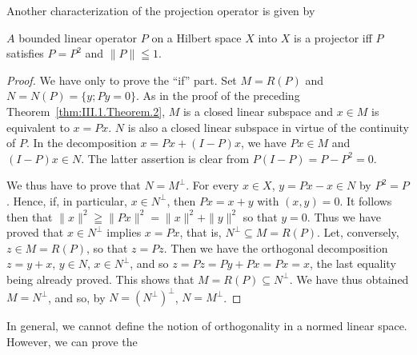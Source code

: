 Another characterization of the projection operator is given by 

\begin{theorem}\label{thm:III.1.Theorem.3} $A$ bounded linear operator $P$ on a Hilbert space $X$ into $X$ is a projector iff $P$ satisfies $P = P^2$ and $\| P \| \leqq 1$. 
\end{theorem}

\begin{proof}
 We have only to prove the ``if'' part. Set $M = R(P)$ and $N = N(P) = \{y; P y = 0\}$. As in the proof of the preceding Theorem~\ref{thm:III.1.Theorem.2}, $M$ is a closed linear subspace and $x \in M$ is equivalent to $x = Px$. $N$ is also a closed linear subspace in virtue of the continuity of $P$. In the decomposition $x = Px + (I - P)x$, we have $Px \in M$ and $(I - P)x \in N$. The latter assertion is clear from $P(I - P) = P - P^{2} = 0$. 

We thus have to prove that $N = M^{\perp}$. For every $x \in X$, $y = Px - x \in N$ by $P^2 = P$. Hence, if, in particular, $x \in N^{\perp}$, then $Px = x + y$ with $(x, y) = 0$. It follows then that $\|x\|^2 \geqq \|Px\|^2 = \|x\|^2 + \|y\|^2$ so that $y = 0$. Thus we have proved that $x \in N^{\perp}$ implies $x = Px$, that is, $N^{\perp} \subseteq M = R(P)$. Let, conversely, $z \in M = R(P)$, so that $z = Pz$. Then we have the orthogonal decomposition $z = y + x$, $y \in N$, $x \in N^{\perp}$, and so $z = Pz = Py + Px = Px = x$, the last equality being already proved. This shows that $M = R(P) \subseteq N^{\perp}$. We have thus obtained $M = N^{\perp}$, and so, by $N = (N^{\perp})^{\perp}$, $N = M^{\perp}$. 
\end{proof}


\label{sec:III.2}

In general, we cannot define the notion of orthogonality in a normed linear space. However, we can prove the 

